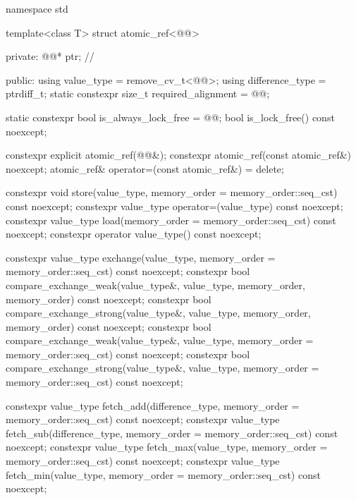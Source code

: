 \begin{codeblock}
namespace std {
  template<class T> struct atomic_ref<@@> {
  private:
    @@* ptr;        // \expos

  public:
    using value_type = remove_cv_t<@@>;
    using difference_type = ptrdiff_t;
    static constexpr size_t required_alignment = @@;

    static constexpr bool is_always_lock_free = @@;
    bool is_lock_free() const noexcept;

    constexpr explicit atomic_ref(@@&);
    constexpr atomic_ref(const atomic_ref&) noexcept;
    atomic_ref& operator=(const atomic_ref&) = delete;

    constexpr void store(value_type, memory_order = memory_order::seq_cst) const noexcept;
    constexpr value_type operator=(value_type) const noexcept;
    constexpr value_type load(memory_order = memory_order::seq_cst) const noexcept;
    constexpr operator value_type() const noexcept;

    constexpr value_type exchange(value_type,
                                  memory_order = memory_order::seq_cst) const noexcept;
    constexpr bool compare_exchange_weak(value_type&, value_type,
                                         memory_order, memory_order) const noexcept;
    constexpr bool compare_exchange_strong(value_type&, value_type,
                                           memory_order, memory_order) const noexcept;
    constexpr bool compare_exchange_weak(value_type&, value_type,
                                         memory_order = memory_order::seq_cst) const noexcept;
    constexpr bool compare_exchange_strong(value_type&, value_type,
                                           memory_order = memory_order::seq_cst) const noexcept;

    constexpr value_type fetch_add(difference_type,
                                   memory_order = memory_order::seq_cst) const noexcept;
    constexpr value_type fetch_sub(difference_type,
                                   memory_order = memory_order::seq_cst) const noexcept;
    constexpr value_type fetch_max(value_type,
                                   memory_order = memory_order::seq_cst) const noexcept;
    constexpr value_type fetch_min(value_type,
                                   memory_order = memory_order::seq_cst) const noexcept;

}}
\end{codeblock}
